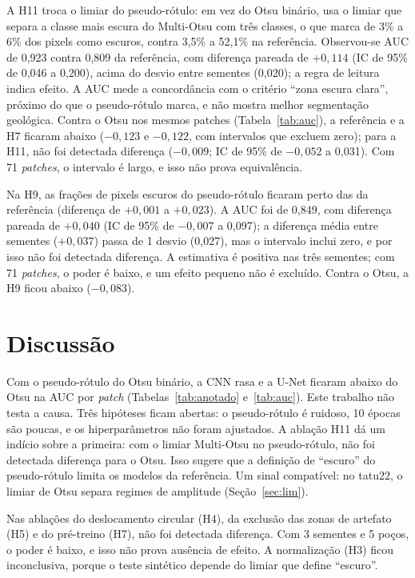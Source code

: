 \documentclass[12pt]{article}
\newif\ifrascunho \rascunhofalse
\newcommand{\fonte}[1]{\ifrascunho\textcolor{blue}{\small(README, #1)}\fi}
\begin{document}
A H11 troca o limiar do pseudo-rótulo: em vez do Otsu binário, usa o limiar que separa a classe mais escura do Multi-Otsu com três classes, o que marca de 3\% a 6\% dos pixels como escuros, contra 3,5\% a 52,1\% na referência. Observou-se AUC de 0,923 contra 0,809 da referência, com diferença pareada de $+0{,}114$ (IC de 95\% de 0,046 a 0,200), acima do desvio entre sementes (0,020); a regra de leitura indica efeito. A AUC mede a concordância com o critério ``zona escura clara'', próximo do que o pseudo-rótulo marca, e não mostra melhor segmentação geológica. Contra o Otsu nos mesmos patches (Tabela~\ref{tab:auc}), a referência e a H7 ficaram abaixo ($-0{,}123$ e $-0{,}122$, com intervalos que excluem zero); para a H11, não foi detectada diferença ($-0{,}009$; IC de 95\% de $-0{,}052$ a 0,031). Com 71 \textit{patches}, o intervalo é largo, e isso não prova equivalência.

Na H9, as frações de pixels escuros do pseudo-rótulo ficaram perto das da referência (diferença de $+0{,}001$ a $+0{,}023$). A AUC foi de 0,849, com diferença pareada de $+0{,}040$ (IC de 95\% de $-0{,}007$ a 0,097); a diferença média entre sementes ($+0{,}037$) passa de 1 desvio (0,027), mas o intervalo inclui zero, e por isso não foi detectada diferença. A estimativa é positiva nas três sementes; com 71 \textit{patches}, o poder é baixo, e um efeito pequeno não é excluído. Contra o Otsu, a H9 ficou abaixo ($-0{,}083$). \fonte{itens 87 a 89} \fonte{item 82 e seção 5.16 do notebook 05; fração escura: item 76}

\section{Discussão}

Com o pseudo-rótulo do Otsu binário, a CNN rasa e a U-Net ficaram abaixo do Otsu na AUC por \textit{patch} (Tabelas~\ref{tab:anotado} e~\ref{tab:auc}). Este trabalho não testa a causa. Três hipóteses ficam abertas: o pseudo-rótulo é ruidoso, 10 épocas são poucas, e os hiperparâmetros não foram ajustados. A ablação H11 dá um indício sobre a primeira: com o limiar Multi-Otsu no pseudo-rótulo, não foi detectada diferença para o Otsu. Isso sugere que a definição de ``escuro'' do pseudo-rótulo limita os modelos da referência. Um sinal compatível: no tatu22, o limiar de Otsu separa regimes de amplitude (Seção~\ref{sec:lim}). \fonte{U12, U23; item 76}

Nas ablações do deslocamento circular (H4), da exclusão das zonas de artefato (H5) e do pré-treino (H7), não foi detectada diferença. Com 3 sementes e 5 poços, o poder é baixo, e isso não prova ausência de efeito. A normalização (H3) ficou inconclusiva, porque o teste sintético depende do limiar que define ``escuro''.
\end{document}
